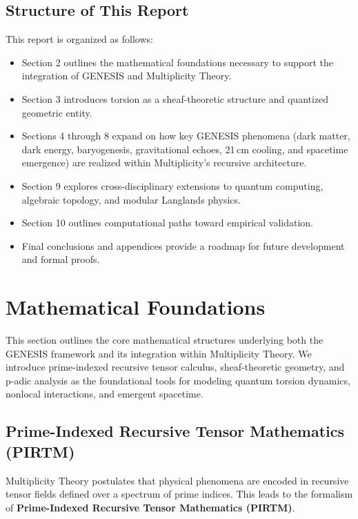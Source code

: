 \documentclass{article}
\theoremstyle{plain}
\begin{document}
\subsection{Structure of This Report}

This report is organized as follows:
\begin{itemize}
    \item Section 2 outlines the mathematical foundations necessary to support the integration of GENESIS and Multiplicity Theory.
    \item Section 3 introduces torsion as a sheaf-theoretic structure and quantized geometric entity.
    \item Sections 4 through 8 expand on how key GENESIS phenomena (dark matter, dark energy, baryogenesis, gravitational echoes, 21 cm cooling, and spacetime emergence) are realized within Multiplicity's recursive architecture.
    \item Section 9 explores cross-disciplinary extensions to quantum computing, algebraic topology, and modular Langlands physics.
    \item Section 10 outlines computational paths toward empirical validation.
    \item Final conclusions and appendices provide a roadmap for future development and formal proofs.
\end{itemize}

\section{Mathematical Foundations}

This section outlines the core mathematical structures underlying both the GENESIS framework and its integration within Multiplicity Theory. We introduce prime-indexed recursive tensor calculus, sheaf-theoretic geometry, and p-adic analysis as the foundational tools for modeling quantum torsion dynamics, nonlocal interactions, and emergent spacetime.

\subsection{Prime-Indexed Recursive Tensor Mathematics (PIRTM)}

Multiplicity Theory postulates that physical phenomena are encoded in recursive tensor fields defined over a spectrum of prime indices. This leads to the formalism of \textbf{Prime-Indexed Recursive Tensor Mathematics (PIRTM)}.
\end{document}
